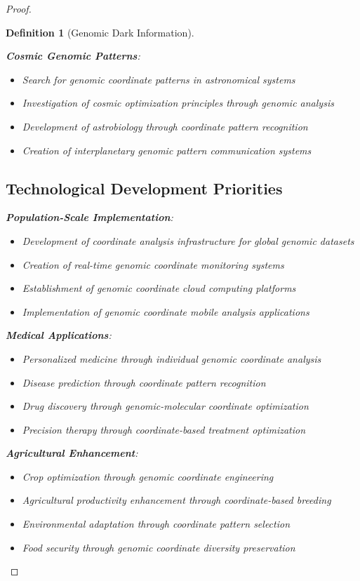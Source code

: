 \documentclass[12pt,a4paper]{article}
\newtheorem{definition}{Definition}
\begin{document}
\begin{proof}
\begin{definition}[Genomic Dark Information]
\begin{algorithm}[H]
\textbf{Cosmic Genomic Patterns}:
\begin{itemize}
\item Search for genomic coordinate patterns in astronomical systems
\item Investigation of cosmic optimization principles through genomic analysis
\item Development of astrobiology through coordinate pattern recognition
\item Creation of interplanetary genomic pattern communication systems
\end{itemize}

\subsection{Technological Development Priorities}

\textbf{Population-Scale Implementation}:
\begin{itemize}
\item Development of coordinate analysis infrastructure for global genomic datasets
\item Creation of real-time genomic coordinate monitoring systems
\item Establishment of genomic coordinate cloud computing platforms
\item Implementation of genomic coordinate mobile analysis applications
\end{itemize}

\textbf{Medical Applications}:
\begin{itemize}
\item Personalized medicine through individual genomic coordinate analysis
\item Disease prediction through coordinate pattern recognition
\item Drug discovery through genomic-molecular coordinate optimization
\item Precision therapy through coordinate-based treatment optimization
\end{itemize}

\textbf{Agricultural Enhancement}:
\begin{itemize}
\item Crop optimization through genomic coordinate engineering
\item Agricultural productivity enhancement through coordinate-based breeding
\item Environmental adaptation through coordinate pattern selection
\item Food security through genomic coordinate diversity preservation
\end{itemize}


\end{algorithm}
\end{definition}
\end{proof}
\end{document}
